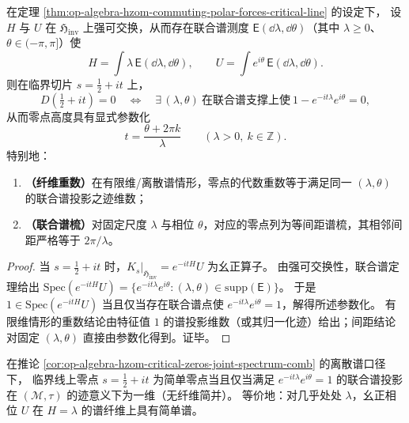\begin{corollary}\label{cor:op-algebra-hzom-critical-zeros-joint-spectrum-comb}
在定理 \ref{thm:op-algebra-hzom-commuting-polar-forces-critical-line} 的设定下，
设 \(H\) 与 \(U\) 在 \(\mathfrak{H}_{\mathrm{inv}}\) 上强可交换，从而存在联合谱测度 \(\mathsf E(\dd\lambda,\dd\theta)\)（其中 \(\lambda\ge 0\)、\(\theta\in(-\pi,\pi]\)）使
\[
H=\int \lambda\,\mathsf E(\dd\lambda,\dd\theta),
\qquad
U=\int e^{i\theta}\,\mathsf E(\dd\lambda,\dd\theta).
\]
则在临界切片 \(s=\tfrac12+it\) 上，
\[
D(\tfrac12+it)=0
\quad\Longleftrightarrow\quad
\exists\,(\lambda,\theta)\ \text{在联合谱支撑上使}\ 1-e^{-it\lambda}e^{i\theta}=0,
\]
从而零点高度具有显式参数化
\[
\boxed{\ t=\frac{\theta+2\pi k}{\lambda}\qquad(\lambda>0,\ k\in\mathbb{Z}).\ }
\]
特别地：
\begin{enumerate}
  \item \textbf{（纤维重数）}在有限维/离散谱情形，零点的代数重数等于满足同一 \((\lambda,\theta)\) 的联合谱投影之迹维数；
  \item \textbf{（联合谱梳）}对固定尺度 \(\lambda\) 与相位 \(\theta\)，对应的零点列为等间距谱梳，其相邻间距严格等于 \(2\pi/\lambda\)。
\end{enumerate}
\end{corollary}
\begin{proof}
当 \(s=\tfrac12+it\) 时，\(K_s|_{\mathfrak{H}_{\mathrm{inv}}}=e^{-itH}U\) 为幺正算子。
由强可交换性，联合谱定理给出
\(
\mathrm{Spec}(e^{-itH}U)=\{e^{-it\lambda}e^{i\theta}:(\lambda,\theta)\in\mathrm{supp}(\mathsf E)\}
\)。
于是 \(1\in\mathrm{Spec}(e^{-itH}U)\) 当且仅当存在联合谱点使 \(e^{-it\lambda}e^{i\theta}=1\)，解得所述参数化。
有限维情形的重数结论由特征值 \(1\) 的谱投影维数（或其归一化迹）给出；间距结论对固定 \((\lambda,\theta)\) 直接由参数化得到。证毕。
\end{proof}

\begin{corollary}\label{cor:op-algebra-hzom-simple-zeros-joint-spectrum}
在推论 \ref{cor:op-algebra-hzom-critical-zeros-joint-spectrum-comb} 的离散谱口径下，
临界线上零点 \(s=\tfrac12+it\) 为简单零点当且仅当满足 \(e^{-it\lambda}e^{i\theta}=1\) 的联合谱投影在 \((\mathcal{M},\tau)\) 的迹意义下为一维（无纤维简并）。
等价地：对几乎处处 \(\lambda\)，幺正相位 \(U\) 在 \(H=\lambda\) 的谱纤维上具有简单谱。
\end{corollary}


